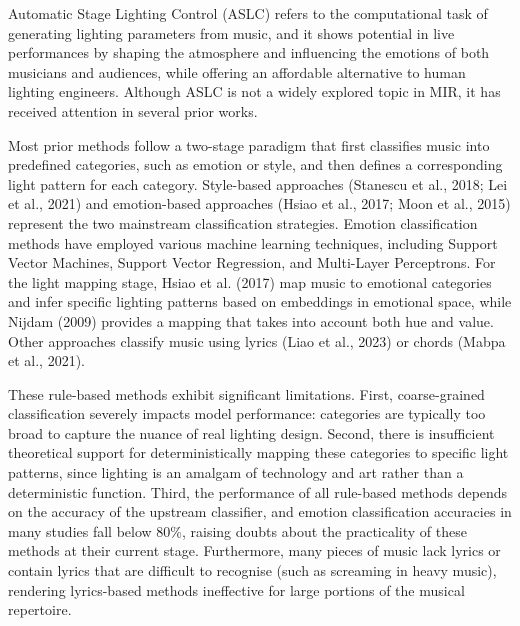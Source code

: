 Automatic Stage Lighting Control (ASLC) refers to the computational task of generating lighting parameters from music, and it shows potential in live performances by shaping the atmosphere and influencing the emotions of both musicians and audiences, while offering an affordable alternative to human lighting engineers. Although ASLC is not a widely explored topic in MIR, it has received attention in several prior works.\cite{zhao2025automatic} 

Most prior methods follow a two-stage paradigm that first classifies music into predefined categories, such as emotion or style, and then defines a corresponding light pattern for each category.\cite{zhao2025automatic}  Style-based approaches (Stanescu et al., 2018; Lei et al., 2021) and emotion-based approaches (Hsiao et al., 2017; Moon et al., 2015) represent the two mainstream classification strategies.\cite{zhao2025automatic}  Emotion classification methods have employed various machine learning techniques, including Support Vector Machines, Support Vector Regression, and Multi-Layer Perceptrons.\cite{zhao2025automatic}  For the light mapping stage, Hsiao et al. (2017) map music to emotional categories and infer specific lighting patterns based on embeddings in emotional space, while Nijdam (2009) provides a mapping that takes into account both hue and value.\cite{zhao2025automatic}  Other approaches classify music using lyrics (Liao et al., 2023) or chords (Mabpa et al., 2021).\cite{zhao2025automatic} 

These rule-based methods exhibit significant limitations. First, coarse-grained classification severely impacts model performance: categories are typically too broad to capture the nuance of real lighting design.\cite{zhao2025automatic}  Second, there is insufficient theoretical support for deterministically mapping these categories to specific light patterns, since lighting is an amalgam of technology and art rather than a deterministic function.\cite{zhao2025automatic}  Third, the performance of all rule-based methods depends on the accuracy of the upstream classifier, and emotion classification accuracies in many studies fall below 80\%, raising doubts about the practicality of these methods at their current stage.\cite{zhao2025automatic}  Furthermore, many pieces of music lack lyrics or contain lyrics that are difficult to recognise (such as screaming in heavy music), rendering lyrics-based methods ineffective for large portions of the musical repertoire.\cite{zhao2025automatic} 

